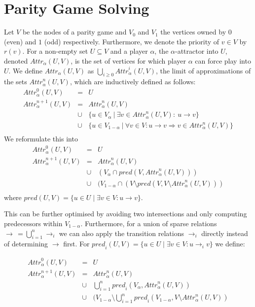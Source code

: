 \documentclass{article}
\newcommand{\attrsym}{\ensuremath{\textit{Attr}}}
\newcommand{\attr}[3][]{\ensuremath{\attrsym^{#1}_{#2}(#3)}}
\newcommand{\pred}{\ensuremath{\textit{pred}}}
\begin{document}
\section{Parity Game Solving}
Let $V$ be the nodes of a parity game and $V_0$ and $V_1$ the vertices owned by $0$ (even) and $1$ (odd) respectively.
Furthermore, we denote the priority of $v \in V$ by $r(v)$.
For a non-empty set $U \subseteq V$ and a player $\alpha$, the
$\alpha$-attractor into $U$, denoted $\attr{\alpha}{U,V}$,
is the set of vertices for which player
$\alpha$ can force play into $U$. We define $\attr{\alpha}{U,V}$ as
$\bigcup\limits_{i \ge 0} \attr[i]{\alpha}{U,V}$,
the limit of approximations\label{def:attractor} of the
sets $\attr[n]{\alpha}{U,V}$, which are inductively defined as follows:
\[
\begin{array}{lcl}
\attr[0]{\alpha}{U, V} & = & U \\
\attr[n+1]{\alpha}{U, V} & = & \attr[n]{\alpha}{U, V} \\
      & \cup & \{u \in V_{\alpha} ~|~ \exists v \in \attr[n]{\alpha}{U,V}:~ u \to v \} \\
      & \cup & \{u \in V_{1 - \alpha} ~|~ \forall v \in V: u \to v \Rightarrow v \in \attr[n]{\alpha}{U, V}\} \\
\end{array}
\]
We reformulate this into
\[
\begin{array}{lcl}
\attr[0]{\alpha}{U, V} & = & U \\
\attr[n+1]{\alpha}{U, V} & = & \attr[n]{\alpha}{U, V} \\
      & \cup & (V_{\alpha} \cap \pred(V, \attr[n]{\alpha}{U, V})) \\
      & \cup & (V_{1 - \alpha} \cap (V \setminus \pred(V, V \setminus \attr[n]{\alpha}{U,V})) \\
\end{array}
\]
where $\pred(U, V) = \{ u \in U \mid \exists v \in V: u \rightarrow v \}$.

This can be further optimised by avoiding two intersections and only computing predecessors within $V_{1 - \alpha}$. 
Furthermore, for a union of sparse relations $\rightarrow \,= \bigcup_{i=1}^{n} \rightarrow_i$ we can also apply the transition relations $\rightarrow_i$ directly instead of determining $\rightarrow$ first.
For $\pred_i(U, V) = \{ u \in U \mid \exists v \in V: u \rightarrow_i v \}$ we define:

\[
\begin{array}{lcl}
\attr[0]{\alpha}{U, V} & = & U \\
\attr[n+1]{\alpha}{U, V} & = & \attr[n]{\alpha}{U, V} \\
      & \cup & \bigcup_{i=1}^{n} \pred_i(V_{\alpha}, \attr[n]{\alpha}{U, V}) \\
      & \cup & (V_{1 - \alpha} \setminus \bigcup_{i=1}^{n} \pred_i(V_{1 - \alpha}, V \setminus \attr[n]{\alpha}{U,V}) \\
\end{array}
\]
\end{document}

